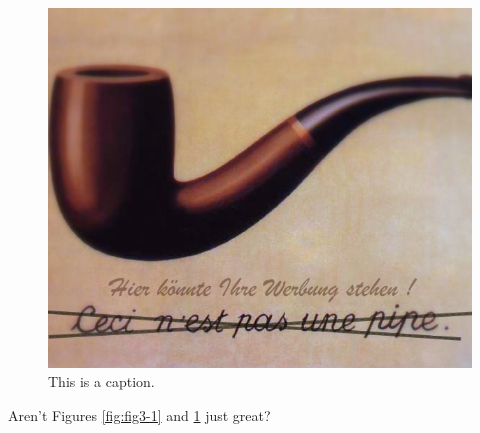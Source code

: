 \begin{figure}
\centering
\includegraphics[width=\textwidth]{figures/Part3/random_image_2.png}%
\caption{This is a caption.}
\label{fig:fig3-2}
\end{figure}



\lipsum[1-2]

Aren't Figures \ref{fig:fig3-1} and \ref{fig:fig3-2} just great?


